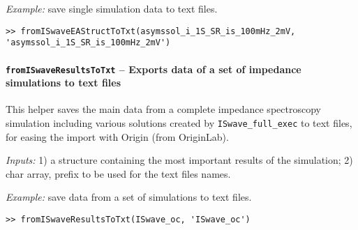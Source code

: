 	\textit{Example:} save single simulation data to text files.
	\begin{lstlisting}[style=Matlab-editor]
>> fromISwaveEAStructToTxt(asymssol_i_1S_SR_is_100mHz_2mV, 'asymssol_i_1S_SR_is_100mHz_2mV')
\end{lstlisting}

	\paragraph{\texttt{from\-ISwave\-Results\-ToTxt} -- Exports data of a set of impedance simulations to text files}
	This helper saves the main data from a complete impedance spectroscopy simulation including various solutions created by \texttt{ISwave\_full\_exec} to text files, for easing the import with Origin (from OriginLab).

	\textit{Inputs:} 1) a structure containing the most important results of the simulation;
	2) char array, prefix to be used for the text files names.




	\textit{Example:} save data from a set of simulations to text files.
	\begin{lstlisting}[style=Matlab-editor]
>> fromISwaveResultsToTxt(ISwave_oc, 'ISwave_oc')
\end{lstlisting}





